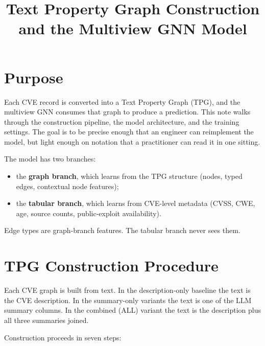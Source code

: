 \documentclass[11pt]{article}
\title{Text Property Graph Construction and the Multiview GNN Model}
\author{}
\date{}
\begin{document}
\maketitle

\section{Purpose}

Each CVE record is converted into a Text Property Graph (TPG), and the
multiview GNN consumes that graph to produce a prediction. This note
walks through the construction pipeline, the model architecture, and
the training settings. The goal is to be precise enough that an
engineer can reimplement the model, but light enough on notation that a
practitioner can read it in one sitting.

The model has two branches:

\begin{itemize}
    \item the \textbf{graph branch}, which learns from the TPG
    structure (nodes, typed edges, contextual node features);
    \item the \textbf{tabular branch}, which learns from CVE-level
    metadata (CVSS, CWE, age, source counts, public-exploit
    availability).
\end{itemize}

Edge types are graph-branch features. The tabular branch never sees
them.

\section{TPG Construction Procedure}

Each CVE graph is built from text. In the description-only baseline
the text is the CVE description. In the summary-only variants the text
is one of the LLM summary columns. In the combined (\textsc{ALL})
variant the text is the description plus all three summaries joined.

Construction proceeds in seven steps:
\end{document}
